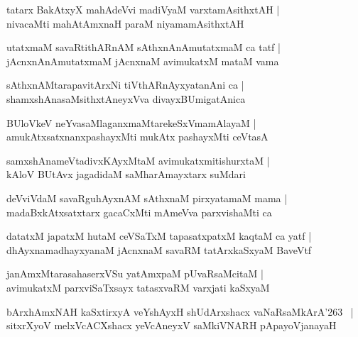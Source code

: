 \documentclass[twoside,12pt,openright]{book}
\def\S{\char'263}
\newcounter{shloka}[chapter]
\begin{document}
\begin{shloka}
tatarx BakAtxyX mahAdeVvi madiVyaM varxtamAsithxtAH |\\
nivacaMti mahAtAmxnaH paraM niyamamAsithxtAH
\end{shloka}

\begin{shloka}
utatxmaM savaRtithARnAM sAthxnAnAmutatxmaM  ca tatf |\\
jAcnxnAnAmutatxmaM jAcnxnaM avimukatxM mataM vama
\end{shloka}

\begin{shloka}
sAthxnAMtarapavitArxNi tiVthARnAyxyatanAni ca |\\
shamxshAnasaMsithxtAneyxVva divayxBUmigatAnica 
\end{shloka}

\begin{shloka}
BUloVkeV neYvasaMlaganxmaMtarekeSxVmamAlayaM |\\
amukAtxsatxnanxpashayxMti mukAtx pashayxMti ceVtasA
\end{shloka}

\begin{shloka}
samxshAnameVtadivxKAyxMtaM avimukatxmitishurxtaM |\\
kAloV BUtAvx jagadidaM saMharAmayxtarx suMdari 
\end{shloka}

\begin{shloka}
deVviVdaM savaRguhAyxnAM sAthxnaM pirxyatamaM mama |\\
madaBxkAtxsatxtarx gacaCxMti mAmeVva parxvishaMti ca 
\end{shloka}

\begin{shloka}
datatxM japatxM hutaM ceVSaTxM tapasatxpatxM kaqtaM ca yatf |\\
dhAyxnamadhayxyanaM jAcnxnaM savaRM tatArxkaSxyaM BaveVtf  
\end{shloka}

\begin{shloka}
janAmxMtarasahaserxVSu yatAmxpaM pUvaRsaMcitaM |\\
avimukatxM parxviSaTxsayx tatasxvaRM varxjati kaSxyaM 
\end{shloka}

\begin{shloka}
bArxhAmxNAH kaSxtirxyA veYshAyxH shUdArxshacx vaNaRsaMkArA\S ~ |\\
sitxrXyoV melxVcACXshacx yeVcAneyxV saMkiVNARH pApayoVjanayaH 
\end{shloka}
\end{document}
